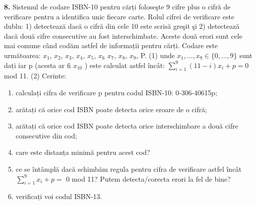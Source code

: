 \documentclass[a4paper]{article}
\begin{document}
\textbf{8.} Sistemul de codare ISBN-10 pentru cărți foloseşte 9 cifre plus o cifră de verificare pentru a identifica
unic fiecare carte.
Rolul cifrei de verificare este dublu: 1) detectează dacă o cifră din cele 10 este
scrisă greşit şi 2) detectează dacă două cifre consecutive au fost interschimbate.
Aceste două erori
sunt cele mai comune când codăm astfel de informații pentru cărți. Codare este următoarea:
$x_{1}$, $x_{2}$, $x_{3}$, $x_{4}$, $x_{5}$, $x_{6}$ $x_{7}$, $x_{8}$, $x_{9}$, P.
(1)
unde $x_{1},...,x_{9}\in\{0,...,9\}$ sunt dați iar p (acesta ar fi
$x_{10}$
) este calculat astfel încât:
$\sum_{i=1}^{9}(11-i)x_{i}+p=0$ mod 11.
(2)
Cerinte:
\begin{enumerate}[label=(\alph*)]
    \item calculați cifra de verificare p pentru codul ISBN-10: 0-306-40615p;
    \item arătați că orice cod ISBN poate detecta orice eroare de o cifră;
    \item arătați că orice cod ISBN poate detecta orice interschimbare a două cifre consecutive din cod;
    \item care este distanța minimă pentru acest cod?
    \item ce se întâmplă dacă schimbăm regula pentru cifra de verificare astfel încât $\sum_{i=1}^{9}x_{i}+p=$
0 mod 11?
Putem detecta/corecta erori la fel de bine?
    \item verificați voi codul ISBN-13.
\end{enumerate}
\end{document}
